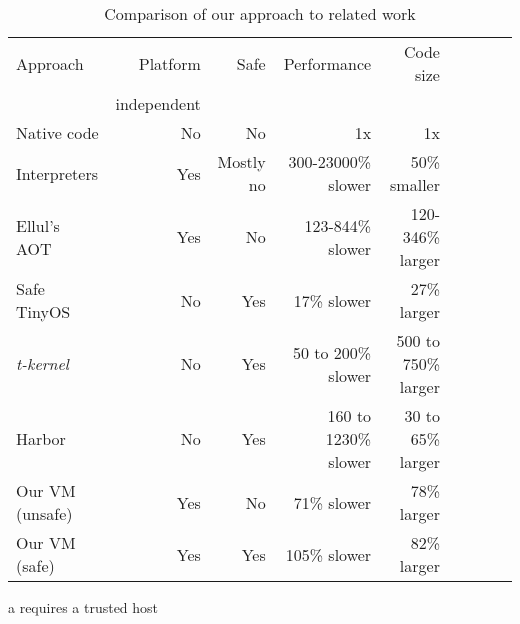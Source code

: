 
\begin{table*}[]
\centering
\caption{Comparison of our approach to related work}
\label{tbl-contribution-comparison}
\begin{threeparttable}
\begin{tabular}{lrrrrrrrr}
\toprule
Approach        & Platform    & Safe               & Performance           & Code size              \\
                & independent &                    &                       & \\
\midrule
Native code     & No          & No                 & 1x                    & 1x                     \\
Interpreters    & Yes         & Mostly no          & 300-23000\% slower    & ~50\% smaller          \\
Ellul's AOT     & Yes         & No                 & 123-844\% slower      & 120-346\% larger       \\
Safe TinyOS     & No          & Yes\tnote{a}       & 17\% slower           & 27\% larger            \\
\emph{t-kernel} & No          & Yes                & 50 to 200\% slower    & 500 to 750\% larger    \\
Harbor          & No          & Yes                & 160 to 1230\% slower  & 30 to 65\% larger      \\
Our VM (unsafe) & Yes         & No                 & 71\% slower           & 78\% larger            \\ %
Our VM (safe)   & Yes         & Yes                & 105\% slower          & 82\% larger            \\ %
\bottomrule
\end{tabular}
\begin{tablenotes}
	\item[a] requires a trusted host
\end{tablenotes}
\end{threeparttable}
\end{table*}
